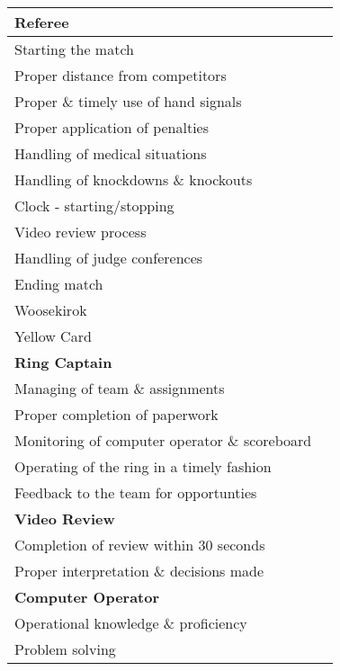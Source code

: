 \documentclass[10pt]{article}
\begin{document}
\begin{center}
\begin{tabular}{|M{0.85\textwidth}|C{0.10\textwidth}|}
        \textbf{Referee} &  \\ \hline
        Starting the match & \\ \hline
        Proper distance from competitors & \\ \hline
        Proper \& timely use of hand signals & \\ \hline
        Proper application of penalties & \\ \hline
        Handling of medical situations & \\ \hline
        Handling of knockdowns \& knockouts & \\ \hline
        Clock - starting/stopping & \\ \hline
        Video review process & \\ \hline
         Handling of judge conferences& \\ \hline
        Ending match & \\ \hline
        Woosekirok & \\ \hline
        Yellow Card & \\ \hline

        \textbf{Ring Captain} &  \\ \hline
        Managing of team \& assignments & \\ \hline
        Proper completion of paperwork& \\ \hline
        Monitoring of computer operator \& scoreboard& \\ \hline
        Operating of the ring in a timely fashion& \\ \hline
        Feedback to the team for opportunties & \\ \hline

        \textbf{Video Review} &  \\ \hline
        Completion of review within 30 seconds& \\ \hline
        Proper interpretation \& decisions made & \\ \hline

        \textbf{Computer Operator} &  \\ \hline
        Operational knowledge \& proficiency& \\ \hline
        Problem solving & \\ \hline


\end{tabular}
\end{center}
\end{document}
